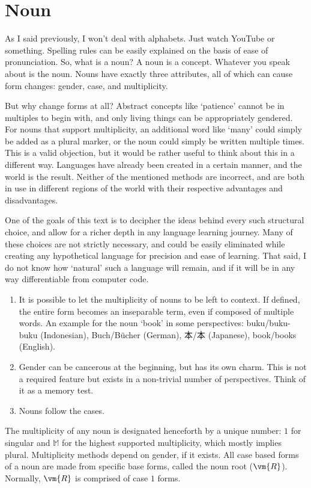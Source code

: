 \section{Noun} \label{sec:ennoun}
As I said previously, I won't deal with alphabets. Just watch YouTube or something. Spelling rules can be easily explained on the basis of ease of pronunciation. So, what is a noun? A noun is a concept. Whatever you speak about is the noun. Nouns have exactly three attributes, all of which can cause form changes:   gender, case, and multiplicity.
 
But why change forms at all? Abstract concepts like `patience' cannot  be in multiples to begin with, and only living things can be appropriately gendered. For nouns that support multiplicity, an additional word like `many' could simply be added as a plural marker, or the noun could simply be written multiple times. This is a valid objection, but it would be rather useful to think about this in a different way. Languages have already been created in a certain manner, and the world is the result. Neither of the mentioned methods are incorrect, and are both in use in different regions of the world  with their respective advantages and disadvantages. 

One of the goals of this text is to decipher the ideas behind every such structural choice, and allow for a richer depth in any language learning journey. Many of these choices are not strictly necessary, and could be easily eliminated while creating any hypothetical language for precision and ease of learning. That said, I do not know how `natural' such a language will remain, and if it will be in any way differentiable from computer code.
\begin{enumerate}
    \item It is possible to let the multiplicity of nouns to be left to context. If defined, the entire form becomes an inseparable term, even if composed of multiple words. An example for the noun `book' in some perspectives: buku/buku-buku (Indonesian), Buch/Bücher (German), \textjapanese{本}/\textjapanese{本} (Japanese), book/books (English). 
    \item Gender can be cancerous at the beginning, but has its own charm. This is not a required feature but exists in a non-trivial number of perspectives. Think of it as a memory test.
    \item Nouns follow the cases.
\end{enumerate}
The multiplicity of any noun is designated henceforth by a unique number: $1$ for singular and $\mathbb{M}$ for the highest supported multiplicity, which mostly implies plural. Multiplicity methods depend on gender, if it exists. All case based forms of a noun are made from specific base forms, called the noun root ($\vm{R}$). Normally, $\vm{R}$ is comprised of  case $1$  forms.

